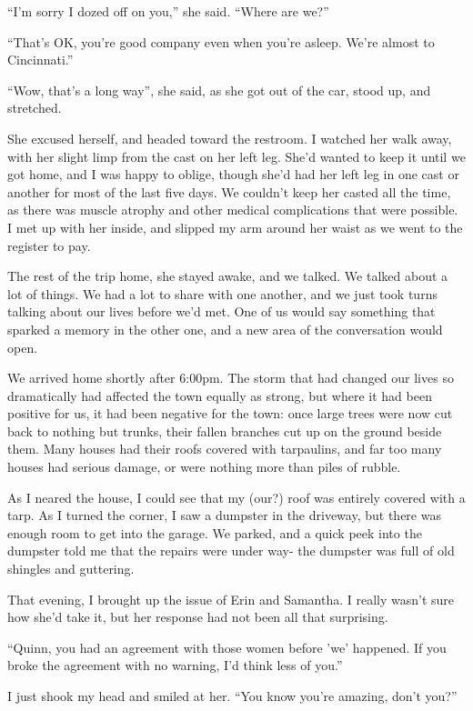 ``I'm sorry I dozed off on you,'' she said. ``Where are we?''

``That's OK, you're good company even when you're asleep. We're almost to Cincinnati.''

``Wow, that's a long way'', she said, as she got out of the car, stood up, and stretched.

She excused herself, and headed toward the restroom. I watched her walk away, with her
slight limp from the cast on her left leg. She'd wanted to keep it until we got home, and I was
happy to oblige, though she'd had her left leg in one cast or another for most of the last five
days. We couldn't keep her casted all the time, as there was muscle atrophy and other medical
complications that were possible. I met up with her inside, and slipped my arm around her waist
as we went to the register to pay.

The rest of the trip home, she stayed awake, and we talked. We talked about a lot of
things. We had a lot to share with one another, and we just took turns talking about our lives
before we'd met. One of us would say something that sparked a memory in the other one, and a new
area of the conversation would open.

We arrived home shortly after 6:00pm. The storm that had changed our lives so dramatically
had affected the town equally as strong, but where it had been positive for us, it had been
negative for the town: once large trees were now cut back to nothing but trunks, their fallen
branches cut up on the ground beside them. Many houses had their roofs covered with tarpaulins,
and far too many houses had serious damage, or were nothing more than piles of rubble.

As I neared the house, I could see that my (our?) roof was entirely covered with a tarp. As
I turned the corner, I saw a dumpster in the driveway, but there was enough room to get into the
garage. We parked, and a quick peek into the dumpster told me that the repairs were under way-
the dumpster was full of old shingles and guttering.

That evening, I brought up the issue of Erin and Samantha. I really wasn't sure how she'd
take it, but her response had not been all that surprising.

``Quinn, you had an agreement with those women before 'we' happened. If you broke the
agreement with no warning, I'd think less of you.''

I just shook my head and smiled at her. ``You know you're amazing, don't you?''

